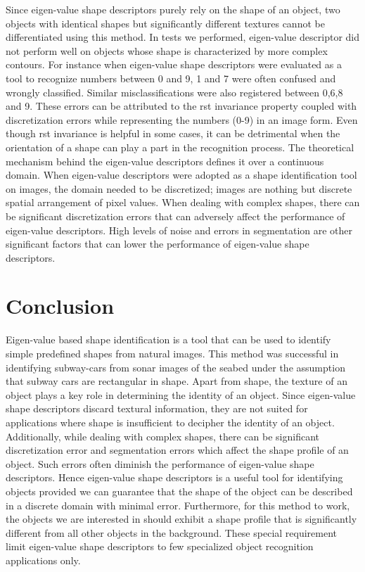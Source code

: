 \documentclass {udthesis}
\begin{document}
Since eigen-value shape descriptors purely rely on the shape of an object, two objects with identical shapes but significantly different textures cannot be differentiated using this method. In tests we performed, eigen-value descriptor did not perform well on objects whose shape is characterized by more complex contours. For instance when eigen-value shape descriptors were evaluated as a tool to recognize numbers between 0 and 9, 1 and 7 were often confused and wrongly classified. Similar misclassifications were also registered between 0,6,8 and 9. These errors can be attributed to the \gls{rst} invariance property coupled with discretization errors while representing the numbers (0-9) in an image form. Even though \gls{rst} invariance is helpful in some cases, it can be detrimental when the orientation of a shape can play a part in the recognition process. The theoretical mechanism behind the eigen-value descriptors defines it over a continuous domain. When eigen-value descriptors were adopted as a shape 
identification tool on images, the domain needed to be discretized; images are nothing but discrete spatial arrangement of pixel values. When dealing with complex shapes, there can be significant discretization errors that can adversely affect the performance of eigen-value descriptors. High levels of noise and errors in segmentation are other significant factors that can lower the performance of eigen-value shape descriptors.


\section{Conclusion}

Eigen-value based shape identification is a tool that can be used to identify simple predefined shapes from natural images. This method was successful in identifying subway-cars from sonar images of the seabed under the assumption that subway cars are rectangular in shape. Apart from shape, the texture of an object plays a key role in determining the identity of an object. Since eigen-value shape descriptors discard textural information, they are not suited for applications where shape is insufficient to decipher the identity of an object. Additionally, while dealing with complex shapes, there can be significant discretization error and segmentation errors which affect the shape profile of an object. Such errors often diminish the performance of eigen-value shape descriptors. Hence eigen-value shape descriptors is a useful tool for identifying objects provided we can guarantee that the shape of the object can be described in a discrete domain with minimal error. Furthermore, for this method to work, the 
objects we are interested in should exhibit a shape profile that is significantly different from all other objects in the background. These special requirement limit eigen-value shape descriptors to few specialized object recognition applications only.

\printglossary[type=\acronymtype]                  
\end{document}

